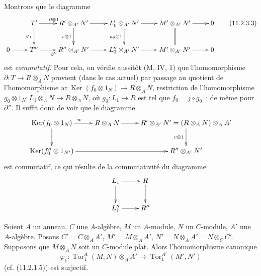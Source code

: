 Montrons que le diagramme
\begin{equation}
\xymatrix{
&T'\ar[r]^{\partial\otimes1}\ar[d]_{\varphi_1}&
R'\otimes_{A'}N'\ar[r]\ar[d]_{v\otimes1}&
L'_0\otimes_{A'}N'\ar[r]\ar[d]_{u_0\otimes1}&
M'\otimes_{A'}N'\ar[r]\ar@{=}[d]&0\\
0\ar[r]&T''\ar[r]_{\partial''}&R''\otimes_{A'}N'\ar[r]&
L''_0\otimes_{A'}N'\ar[r]&M'\otimes_{A'}N'\ar[r]&0
}
\label{IV.11.2.3.3-fr}
\tag{11.2.3.3}
\end{equation}
est \emph{commutatif}. Pour cela, on vérifie aussitôt (M, IV, 1) que
l'homomorphisme $\partial:T\to R\otimes_AN$ provient (dans le cas actuel)
par passage au quotient de l'homomorphisme
$w:\operatorname{Ker}(f_0\otimes1_N)\to R\otimes_AN$, restriction de
l'homomorphisme $g_0\otimes1_N:L_1\otimes_AN\to R\otimes_AN$, où
$g_0:L_1\to R$ est tel que $f_0=j\circ g_0$~; de même pour $\partial''$.
Il suffit donc de voir que le diagramme
\[
\xymatrix{
\operatorname{Ker}(f_0\otimes1_N)\ar[r]^w\ar[d]&R\otimes_AN\ar[r]&
R'\otimes_{A'}N'=(R\otimes_AN)\otimes_AA'\ar[d]_{v\otimes1}\\
\operatorname{Ker}(f''_0\otimes1_{N'})\ar[rr]&&R''\otimes_{A'}N'
}
\]
est commutatif, ce qui résulte de la commutativité du diagramme
\[
\xymatrix{
L_1\ar[r]\ar[d]&R\ar[d]\\
L''_1\ar[r]&R''
}
\]

\begin{lemma}[11.2.4]
\label{IV.11.2.4-fr}
Soient $A$ un anneau, $C$ une $A$-algèbre, $M$ un $A$-module, $N$ un
$C$-module, $A'$ une $A$-algèbre. Posons $C'=C\otimes_AA'$,
$M'=M\otimes_AA'$, $N'=N\otimes_AA'=N\otimes_CC'$. Supposons que
$M\otimes_AN$ soit un $C$-module plat. Alors l'homomorphisme canonique
\[
\varphi_1:\operatorname{Tor}_1^A(M,N)\otimes_AA'
\to\operatorname{Tor}_1^{A'}(M',N')
\]
\textup{(cf. (11.2.1.5))} est surjectif.
\end{lemma}

